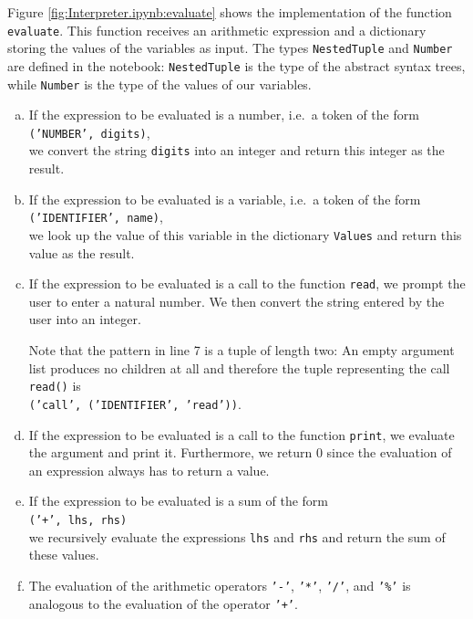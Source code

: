 Figure \ref{fig:Interpreter.ipynb:evaluate} shows the implementation of the function \texttt{evaluate}.
This function receives an arithmetic expression and a dictionary storing the
values of the variables as input.  The types \texttt{NestedTuple} and \texttt{Number} are defined in the
notebook:  \texttt{NestedTuple} is the type of the abstract syntax trees, while \texttt{Number} is the type of
the values of our variables.
\begin{enumerate}[(a)]
\item If the expression to be evaluated is a number, i.e.~a token of the form
      \\[0.2cm]
      \hspace*{1.3cm}
      \texttt{('NUMBER', digits)},
      \\[0.2cm]
      we convert the string \texttt{digits} into an integer and return this integer as the result.
\item If the expression to be evaluated is a variable, i.e.~a token of the form
      \\[0.2cm]
      \hspace*{1.3cm}
      \texttt{('IDENTIFIER', name)},
      \\[0.2cm]
      we look up the value of this variable in the dictionary \texttt{Values} and return this value as the
      result.
\item If the expression to be evaluated is a call to the function \texttt{read},
      we prompt the user to enter a natural number.  We then convert the string entered by the user into an integer.

      Note that the pattern in line 7 is a tuple of length two:  An empty argument list produces no
      children at all and therefore the tuple representing the call \texttt{read()} is
      \\[0.2cm]
      \hspace*{1.3cm}
      \texttt{('call', ('IDENTIFIER', 'read'))}.
\item If the expression to be evaluated is a call to the function \texttt{print}, we evaluate the argument and
      print it.  Furthermore, we return 0 since the evaluation of an expression always has to return a value.
\item If the expression to be evaluated is a sum of the form
      \\[0.2cm]
      \hspace*{1.3cm}
      \texttt{('+', lhs, rhs)}
      \\[0.2cm]
      we recursively evaluate the expressions \texttt{lhs} and \texttt{rhs} and return the sum of these
      values. 
\item The evaluation of the arithmetic operators \texttt{'-'}, \texttt{'*'}, \texttt{'/'}, and \texttt{'\%'}
      is analogous to the evaluation of the operator \texttt{'+'}.
\end{enumerate}
\FloatBarrier

